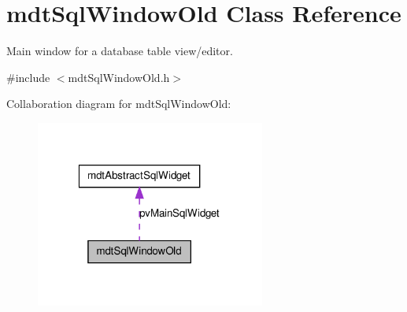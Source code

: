 \hypertarget{classmdt_sql_window_old}{
\section{mdtSqlWindowOld Class Reference}
\label{classmdt_sql_window_old}
}


Main window for a database table view/editor.  




{\ttfamily \#include $<$mdtSqlWindowOld.h$>$}



Collaboration diagram for mdtSqlWindowOld:\nopagebreak
\begin{figure}[H]
\begin{center}
\leavevmode
\includegraphics[width=214pt]{classmdt_sql_window_old__coll__graph}
\end{center}
\end{figure}
